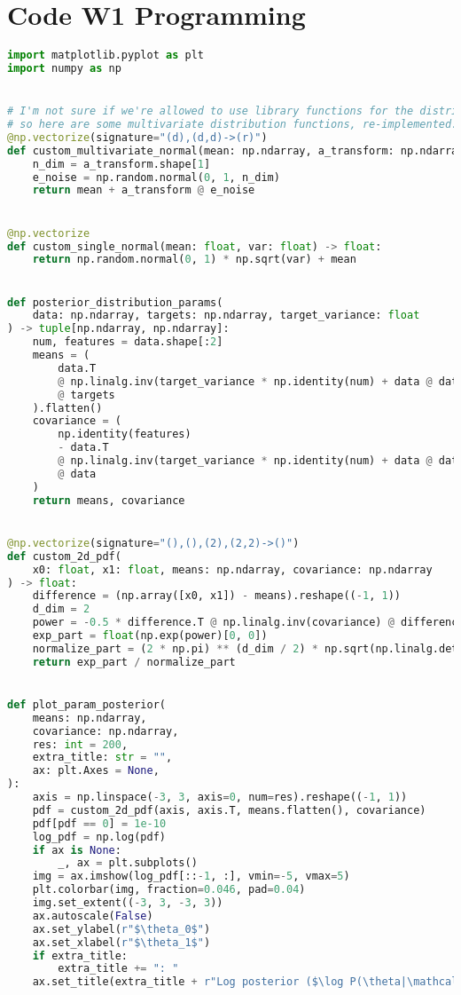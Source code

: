 \documentclass[11pt]{article} %
\begin{document}
\section{Code W1 Programming}
\label{code_w1}
\begin{lstlisting}[language=Python]
import matplotlib.pyplot as plt
import numpy as np


# I'm not sure if we're allowed to use library functions for the distributions,
# so here are some multivariate distribution functions, re-implemented.
@np.vectorize(signature="(d),(d,d)->(r)")
def custom_multivariate_normal(mean: np.ndarray, a_transform: np.ndarray) -> np.ndarray:
    n_dim = a_transform.shape[1]
    e_noise = np.random.normal(0, 1, n_dim)
    return mean + a_transform @ e_noise


@np.vectorize
def custom_single_normal(mean: float, var: float) -> float:
    return np.random.normal(0, 1) * np.sqrt(var) + mean


def posterior_distribution_params(
    data: np.ndarray, targets: np.ndarray, target_variance: float
) -> tuple[np.ndarray, np.ndarray]:
    num, features = data.shape[:2]
    means = (
        data.T
        @ np.linalg.inv(target_variance * np.identity(num) + data @ data.T)
        @ targets
    ).flatten()
    covariance = (
        np.identity(features)
        - data.T
        @ np.linalg.inv(target_variance * np.identity(num) + data @ data.T)
        @ data
    )
    return means, covariance


@np.vectorize(signature="(),(),(2),(2,2)->()")
def custom_2d_pdf(
    x0: float, x1: float, means: np.ndarray, covariance: np.ndarray
) -> float:
    difference = (np.array([x0, x1]) - means).reshape((-1, 1))
    d_dim = 2
    power = -0.5 * difference.T @ np.linalg.inv(covariance) @ difference
    exp_part = float(np.exp(power)[0, 0])
    normalize_part = (2 * np.pi) ** (d_dim / 2) * np.sqrt(np.linalg.det(covariance))
    return exp_part / normalize_part


def plot_param_posterior(
    means: np.ndarray,
    covariance: np.ndarray,
    res: int = 200,
    extra_title: str = "",
    ax: plt.Axes = None,
):
    axis = np.linspace(-3, 3, axis=0, num=res).reshape((-1, 1))
    pdf = custom_2d_pdf(axis, axis.T, means.flatten(), covariance)
    pdf[pdf == 0] = 1e-10
    log_pdf = np.log(pdf)
    if ax is None:
        _, ax = plt.subplots()
    img = ax.imshow(log_pdf[::-1, :], vmin=-5, vmax=5)
    plt.colorbar(img, fraction=0.046, pad=0.04)
    img.set_extent((-3, 3, -3, 3))
    ax.autoscale(False)
    ax.set_ylabel(r"$\theta_0$")
    ax.set_xlabel(r"$\theta_1$")
    if extra_title:
        extra_title += ": "
    ax.set_title(extra_title + r"Log posterior ($\log P(\theta|\mathcal{D})$)")



\end{lstlisting}
\end{document}
